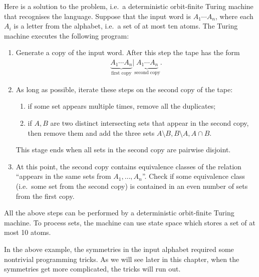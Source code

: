 \begin{myexample}
	Here is a solution to the problem, i.e.~a deterministic orbit-finite Turing machine that recognises the language. Suppose that the input word is $A_1 \cdots A_n$, where each $A_i$ is a letter from the alphabet, i.e.~a set of at most ten atoms.
The Turing machine executes the following program:
\begin{enumerate}
	\item Generate a copy of the input word. After this step the tape has the form
	\begin{align*}
	\underbrace{A_1 \cdots A_n}_{\text{first copy}} | \underbrace{A_1 \cdots A_n}_{\text{second copy}}.
	\end{align*}
	\item As long as possible, iterate these steps on the second copy of the tape: 
	\begin{enumerate}
		\item if some set appears multiple times, remove all  the duplicates;
		\item if $A,B$ are two distinct intersecting sets that appear in the second copy, then remove them and add the three  sets $A \setminus B, B \setminus A, A \cap B$. 
	\end{enumerate}
	This stage ends when all sets in the second copy are pairwise disjoint.
	\item At this point, the second copy contains equivalence classes of the relation ``appears in the same sets from $A_1,\ldots,A_n$''. Check if some equivalence class (i.e.~some set from the second copy) is contained in an even number of sets from the first copy.
\end{enumerate}
	
All the above steps can be performed by a deterministic orbit-finite Turing machine. To process sets, the machine can use state space which stores a set of at most 10 atoms.
	\end{myexample}

In the above example, the symmetries in the input alphabet required some nontrivial programming tricks. As we will see later in this chapter, when the symmetries get more complicated, the tricks will run out. 

